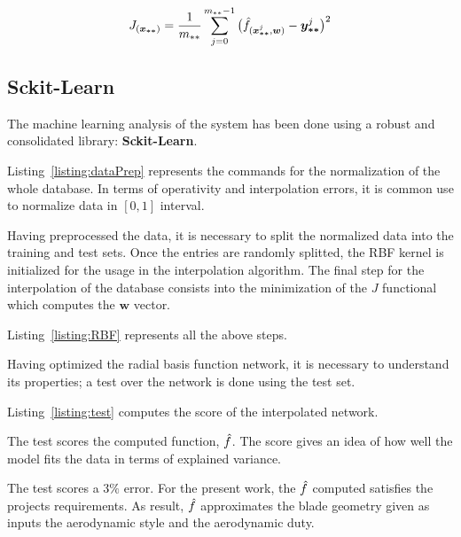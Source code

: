 \begin{equation}
    J_{(\boldsymbol{x_{**}})} = \frac{1}{m_{**}} \sum^{m_{**} - 1}_{j = 0} \big( \hat{\mathnormal{f}}_{ (\boldsymbol{x}^{j}_{\boldsymbol{**}}, \boldsymbol{w})} - \boldsymbol{y}^{j}_{\boldsymbol{**}}\big)^2 
    \label{eqn:MLtest}
\end{equation}

\subsection{Sckit-Learn}

The machine learning analysis of the system has been done using a robust and consolidated library: \textbf{Sckit-Learn}.

Listing~\ref{listing:dataPrep} represents the commands for the normalization of the whole database. In terms of 
operativity and interpolation errors, it is common use to normalize data in $[0, 1]$ interval.



Having preprocessed the data, it is necessary to split the normalized data into the training and test sets. 
Once the entries are randomly splitted, the RBF kernel is initialized for the usage in the interpolation algorithm.
The final step for the interpolation of the database consists into the minimization of the $J$ functional 
which computes the $\boldsymbol{w}$ vector. 

Listing~\ref{listing:RBF} represents all the above steps. 



Having optimized the radial basis function network, it is necessary to understand its properties; 
a test over the network is done using the test set. 

Listing~\ref{listing:test} computes the score of the interpolated network.



The test scores the computed function, $\hat{\mathnormal{f}}$. 
The score gives an idea of how well the model fits the data in terms of explained variance.

The test scores a $3\%$ error. For the present work, the $\hat{\mathnormal{f}}$ computed satisfies 
the projects requirements. As result, $\hat{\mathnormal{f}}$ approximates the blade geometry given as 
inputs the aerodynamic style and the aerodynamic duty.

